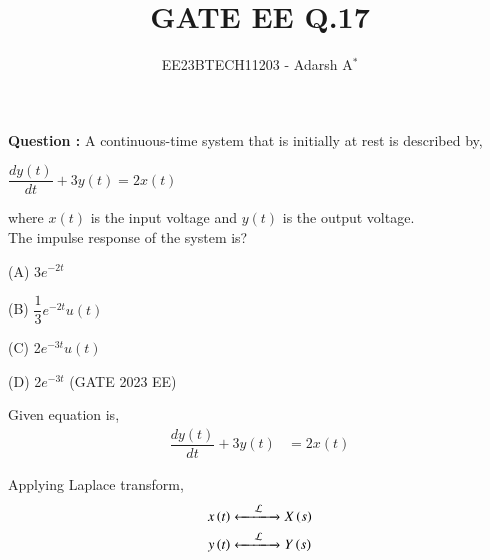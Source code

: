 \documentclass[journal,12pt,onecolumn]{IEEEtran}
\theoremstyle{remark}
\begin{document}
	
	
	\vspace{3cm}
	
	\title{GATE EE Q.17}
	\author{EE23BTECH11203 - Adarsh A$^{*}$%
	}
	\maketitle
	\bigskip
	
	\renewcommand{\thefigure}{\theenumi}
	\renewcommand{\thetable}{\theenumi}
	
	
	\vspace{0.2cm}
	\linespread{1.1}
	
	
	\textbf{ Question : }
	 A continuous-time system that is initially at rest is described by,
	\begin{center}
		$\dfrac{dy(t)}{dt} + 3y(t) = 2x(t)$
	\end{center}
	where $x(t)$ is the input voltage and $y(t)$ is the output voltage.\\ 
	The impulse response of the system is?
	
	\vspace{0.2cm}
	
	(A) 3$e^{-2t}$
	
	\vspace{0.3cm}
	
	(B) $\dfrac{1}{3}e^{-2t} u(t)$
	
	\vspace{0.3cm}
	
	(C) 2$e^{-3t} u(t)$
	
	\vspace{0.2cm}
	
	(D) 2$e^{-3t}$ \hfill(GATE 2023 EE)
	
	\vspace{0.2cm}
	
	\solution
	
	
	\fi
	
	Given equation is,
	\begin{align}
		\dfrac{dy(t)}{dt} + 3y(t) &= 2x(t)
	\end{align}
	
	Applying Laplace transform,
	\begin{align}
		x\left(t\right) &
		\xleftarrow[]{\hspace{0.4cm}{\mathcal{L}}\hspace{0.1cm}}\xrightarrow[]{}
		X\left(s\right)\\
		y\left(t\right) &
		\xleftarrow[]{\hspace{0.4cm}{\mathcal{L}}\hspace{0.1cm}}\xrightarrow[]{}
		Y\left(s\right)
	\end{align}
	
\end{document}

